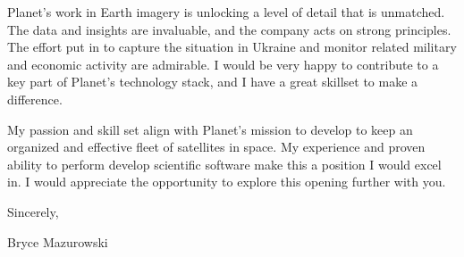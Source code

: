 \documentclass{resume}
\begin{document}
Planet's work in Earth imagery is unlocking a level of detail that
is unmatched.
%
The data and insights are invaluable, and the company acts on strong
principles.
%
The effort put in to capture the situation in Ukraine and monitor
related military and economic activity are admirable.
%
I would be very happy to contribute to a key part of Planet's
technology stack, and I have a great skillset to make a difference.
%


My passion and skill set align with Planet's mission to develop
to keep an organized and effective fleet of satellites in space.
%
My experience and proven ability to perform develop scientific software
make this a position I would excel in.
%
I would appreciate the opportunity to explore this opening further with you.
%


Sincerely,

Bryce Mazurowski
\end{document}
